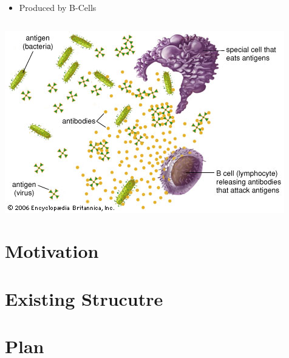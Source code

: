 \documentclass{beamer}
\begin{document}
\begin{frame}
\begin{columns}
\begin{column}{5cm}
\begin{itemize}
     \item Produced by B-Cells
    \end{itemize}

    \end{column}
  \end{columns}

\end{frame}

\begin{frame}
\includegraphics[width=\textwidth]{antigens-antibodies.jpg}
\end{frame}

\section{Motivation}
\section{Existing Strucutre}
\section{Plan}
\end{document}
